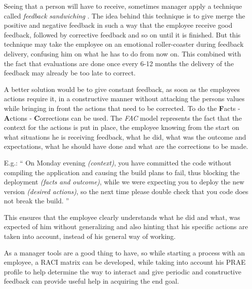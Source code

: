 Seeing that a person will have to receive, sometimes manager apply a technique called \textit{feedback sandwiching} \cite{fbs}. The idea behind this technique is to give merge the positive and negative feedback in such a way that the employee receive good feedback, followed by corrective feedback and so on until it is finished. But this technique may take the employee on an emotional roller-coaster during feedback delivery, confusing him on what he has to do from now on. This combined with the fact that evaluations are done once every 6-12 months the delivery of the feedback may already be too late to correct.

A better solution would be to give constant feedback, as soon as the employees actions require it, in a constructive manner without attacking the persons values while bringing in front the actions that need to be corrected. To do the \textbf{F}acts - \textbf{A}ctions - \textbf{C}orrections can be used. The \textit{FAC} model represents the fact that the context for the actions is put in place, the employee knowing from the start on what situations he is receiving feedback, what he did, what was the outcome and expectations, what he should have done and what are the corrections to be made.

E.g.:
`` On Monday evening \textit{(context)}, you have committed the code without compiling the application and causing the build plans to fail, thus blocking the deployment \textit{(facts and outcome)}, while we were expecting you to deploy the new version \textit{(desired actions)}, so the next time please double check that you code does not break the build. ''

This ensures that the employee clearly understands what he did and what, was expected of him without generalizing and also hinting that his specific actions are taken into account, instead of his general way of working.


As a manager tools are a good thing to have, so while starting a process with an employee, a RACI matrix can be developed, while taking into account his PRAE profile to help determine the way to interact and give periodic and constructive feedback can provide useful help in acquiring the end goal.